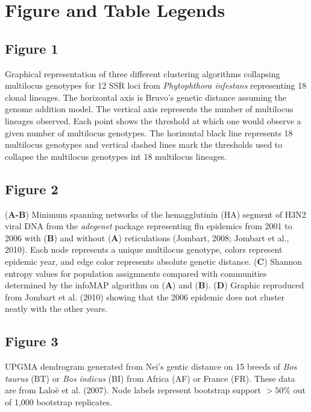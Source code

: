 \documentclass{frontiersSCNS} %
\begin{document}
\section*{Figure and Table Legends}\label{figure-and-table-legends}

\subsection*{Figure 1}\label{figure-1-1}

Graphical representation of three different clustering algorithms
collapsing multilocus genotypes for 12 SSR loci from \emph{Phytophthora
infestans} representing 18 clonal lineages. The horizontal axis is
Bruvo's genetic distance assuming the genome addition model. The
vertical axis represents the number of multilocus lineages observed.
Each point shows the threshold at which one would observe a given number
of multilocus genotypes. The horizontal black line represents 18
multilocus genotypes and vertical dashed lines mark the thresholds used
to collapse the multilocus genotypes int 18 multilocus lineages.

\subsection*{Figure 2}\label{figure-2-1}

(\textbf{A-B}) Minimum spanning networks of the hemagglutinin (HA)
segment of H3N2 viral DNA from the \emph{adegenet} package representing
flu epidemics from 2001 to 2006 with (\textbf{B}) and without
(\textbf{A}) reticulations (Jombart, 2008; Jombart et al., 2010). Each
node represents a unique multilocus genotype, colors represent epidemic
year, and edge color represents absolute genetic distance. (\textbf{C})
Shannon entropy values for population assignments compared with
communities determined by the infoMAP algorithm on (\textbf{A}) and
(\textbf{B}). (\textbf{D}) Graphic reproduced from Jombart et al. (2010)
showing that the 2006 epidemic does not cluster neatly with the other
years.

\subsection*{Figure 3}\label{figure-3-1}

UPGMA dendrogram generated from Nei's gentic distance on 15 breeds of
\emph{Bos taurus} (BT) or \emph{Bos indicus} (BI) from Africa (AF) or
France (FR). These data are from Lalo{ë} et al. (2007). Node labels
represent bootstrap support \(>50\%\) out of 1,000 bootstrap replicates.
\end{document}
